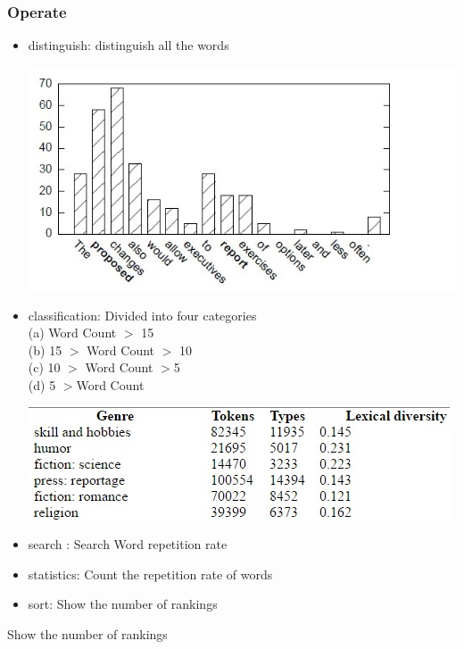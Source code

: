 \subsubsection*{Operate}
\begin{itemize}
	\item distinguish: distinguish all the words
	\begin{center}
		\includegraphics[width=0.8\columnwidth]{union_01.jpg}
	\end{center}
	\item classification: Divided into four categories\\ 	
	(a)  Word Count $>$ 15\\
	(b)  15 $>$ Word Count $>$ 10\\
	(c)  10 $>$ Word Count $>$5\\
	(d)  5 $>$Word Count	
	\begin{center}
		\includegraphics[width=0.8\columnwidth]{union_02.jpg}
	\end{center}
	\item search : Search Word repetition rate
	\item statistics: Count the repetition rate of words
	\item sort: Show the number of rankings
\end{itemize}
Show the number of rankings \\

